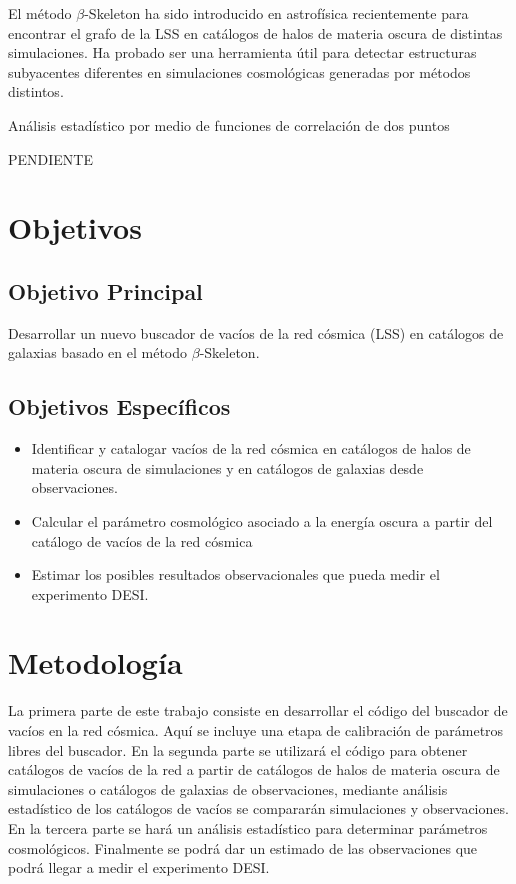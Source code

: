 \documentclass[preprint]{aastex62}
\begin{document}
  El método $\beta$-Skeleton ha sido introducido en astrofísica recientemente \citep{Fang2018} para
  encontrar el grafo de la LSS en catálogos de halos de materia oscura de distintas simulaciones.
  Ha probado ser una herramienta útil para detectar estructuras subyacentes diferentes en
  simulaciones cosmológicas generadas por métodos distintos.

  Análisis estadístico por medio de funciones de correlación de dos puntos

  \medskip
  PENDIENTE
  \medskip
  
  \section{Objetivos}

  \subsection{Objetivo Principal}
  Desarrollar un nuevo buscador de vacíos de la red cósmica (LSS) en catálogos de galaxias
  basado en el método $\beta$-Skeleton.
  
  \subsection{Objetivos Específicos}

  \begin{itemize}

      \item Identificar y catalogar vacíos de la red cósmica en catálogos de halos de materia oscura de
  simulaciones y en catálogos de galaxias desde observaciones.

      \item Calcular el parámetro cosmológico asociado a la energía oscura a partir del catálogo de
  vacíos de la red cósmica

    \item  Estimar los posibles resultados observacionales que pueda medir el experimento DESI.
  \end{itemize}
  
  \section{Metodología}

  La primera parte de este trabajo consiste en desarrollar el código del buscador de vacíos
  en la red cósmica. Aquí se incluye una etapa de calibración de parámetros libres del buscador.
  En la segunda parte se utilizará el código para obtener catálogos
  de vacíos de la red a partir de catálogos de halos de materia oscura de simulaciones o
  catálogos de galaxias de observaciones, mediante análisis estadístico de los catálogos de
  vacíos se compararán simulaciones y observaciones.
  En la tercera parte se hará un análisis estadístico para determinar parámetros cosmológicos.
  Finalmente se podrá dar un estimado de las observaciones que podrá llegar a medir el
  experimento DESI.
\end{document}
